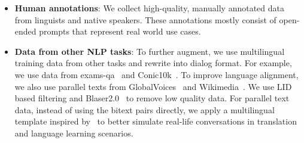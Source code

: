 \begin{itemize}
        \item \textbf{Human annotations}: We collect high-quality, manually annotated data from linguists and native speakers. These annotations mostly consist of open-ended prompts that represent real world use cases. %

        \item \textbf{Data from other NLP tasks}: To further augment, we use multilingual training data from other tasks and rewrite into dialog format. For example, we use data from exams-qa~\citep{hardalov-etal-2020-exams} and Conic10k~\citep{wu2023conic10kchallengingmathproblem}. To improve language alignment, we also use parallel texts from GlobalVoices~\citep{PROKOPIDIS16.778} and Wikimedia~\citep{Tiedemann2012ParallelDT}. We use LID based filtering and Blaser2.0~\citep{seamlessm4t2023} to remove low quality data. For parallel text data, instead of using the bitext pairs directly, we apply a multilingual template inspired by~\citet{weifinetuned} to better simulate real-life conversations in translation and language learning scenarios.
     

\end{itemize}
